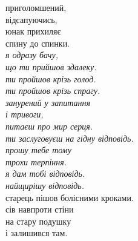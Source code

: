 приголомшений,\\
відсапуючись,\\
юнак прихиляє\\
спину до спинки.\\

\emph{я одразу бачу,\\
що ти прийшов здалеку.\\
ти пройшов крізь голод.\\
ти пройшов крізь спрагу.}\\

\emph{занурений у запитання\\
і тривоги,\\
питаєш про мир серця.\\
ти заслуговуєш на гідну відповідь.}\\

\emph{прошу тебе тому\\
трохи терпіння.\\
я дам тобі відповідь.\\
найщирішу відповідь.}\\

старець пішов болісними кроками.\\
сів навпроти стіни\\
на стару подушку\\
і залишився там.
